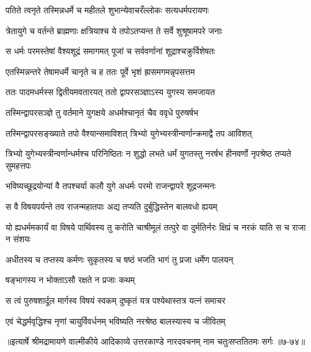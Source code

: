 \twolineshloka
{पतिते त्वनृते तस्मिन्नधर्मे च महीतले}
{शुभान्येवाचरँल्लोकः सत्यधर्मपरायणः} %

\twolineshloka
{त्रेतायुगे च वर्तन्ते ब्राह्मणाः क्षत्रियाश्च ये}
{तपोऽतप्यन्त ते सर्वे शुश्रूषामपरे जनाः} %

\twolineshloka
{स धर्मः परमस्तेषां वैश्यशूद्रं समागमत्}
{पूजां च सर्ववर्णानां शूद्राश्चक्रुर्विशेषतः} %

\twolineshloka
{एतस्मिन्नन्तरे तेषामधर्मे चानृते च ह}
{ततः पूर्वे भृशं ह्रासमगमन्नृपसत्तम} %

\twolineshloka
{ततः पादमधर्मस्स द्वितीयमवतारयत्}
{ततो द्वापरसञ्ज्ञाऽस्य युगस्य समजायत} %

\twolineshloka
{तस्मिन्द्वापरसञ्ज्ञे तु वर्तमाने युगक्षये}
{अधर्मश्चानृतं चैव ववृधे पुरुषर्षभ} %

\twolineshloka
{तस्मिन्द्वापरसङ्ख्याते तपो वैश्यान्समाविशत्}
{त्रिभ्यो युगेभ्यस्त्रीन्वर्णान्क्रमाद्वै तप आविशत्} %

\threelineshloka
{त्रिभ्यो युगेभ्यस्त्रीन्वर्णान्धर्मश्च परिनिष्ठितः}
{न शुद्धो लभते धर्मं युगतस्तु नरर्षभ}
{हीनवर्णो नृपश्रेष्ठ तप्यते सुमहत्तपः} %

\twolineshloka
{भविष्यच्छूद्रयोन्यां वै तपश्चर्या कलौ युगे}
{अधर्मः परमो राजन्द्वापरे शूद्रजन्मनः} %

\twolineshloka
{स वै विषयपर्यन्ते तव राजन्महातपाः}
{अद्य तप्यति दुर्बुद्धिस्तेन बालवधो ह्ययम्} %

\threelineshloka
{यो ह्यधर्ममकार्यं वा विषये पार्थिवस्य तु}
{करोति चाश्रीमूलं तत्पुरे वा दुर्मतिर्नरः}
{क्षिप्रं च नरकं याति स च राजा न संशयः} %

\twolineshloka
{अधीतस्य च तप्तस्य कर्मणः सुकृतस्य च}
{षष्ठं भजति भागं तु प्रजा धर्मेण पालयन्} %

\onelineshloka
{षङ्भागस्य न भोक्ताऽसौ रक्षते न प्रजाः कथम्} %

\twolineshloka
{स त्वं पुरुषशार्दूल मार्गस्व विषयं स्वकम्}
{दुष्कृतं यत्र पश्येथास्तत्र यत्नं समाचर} %

\twolineshloka
{एवं चेद्धर्मवृद्धिश्च नृणां चायुर्विवर्धनम्}
{भविष्यति नरश्रेष्ठ बालस्यास्य च जीवितम्} %


॥इत्यार्षे श्रीमद्रामायणे वाल्मीकीये आदिकाव्ये उत्तरकाण्डे नारदवचनम् नाम चतुःसप्ततितमः सर्गः ॥७-७४॥
